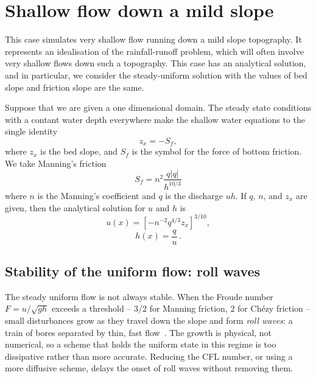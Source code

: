 

\section{Shallow flow down a mild slope}
This case simulates very shallow flow running down a mild slope topography. It represents an idealisation of the rainfall-runoff problem, which will often involve very shallow flows down such a topography. This case has an analytical solution, and in particular, we consider the steady-uniform solution with the values of bed slope and friction slope are the same.   

Suppose that we are given a one dimensional domain. The steady state conditions with a contant water depth everywhere make the shallow water equations to the single identity
\begin{equation}
z_x = - S_f, 
\end{equation}
where $z_x$ is the bed slope, and $S_f$ is the symbol for the force of bottom friction.  We take Manning's friction
\begin{equation}
S_f = n^2 \frac{q|q|}{h^{10/3}}
\end{equation}
where $n$ is the Manning's coefficient and $q$ is the discharge $uh$. 
If $q$, $n$, and $z_x$ are given, then the analytical solution for $u$ and $h$ is
\begin{equation}
u(x)= \left[- n^{-2} q^{4/3} z_x\right]^{3/10},
\end{equation}
\begin{equation}
h(x)= \frac{q}{u}\,.
\end{equation}

\subsection{Stability of the uniform flow: roll waves}
The steady uniform flow is not always stable. When the Froude number
$F = u/\sqrt{gh}$ exceeds a threshold -- $3/2$ for Manning friction, $2$ for
Ch\'ezy friction -- small disturbances grow as they travel down the slope and
form \emph{roll waves}: a train of bores separated by thin, fast
flow~\cite{Dressler1949}. The growth is physical, not numerical, so a scheme
that holds the uniform state in this regime is too dissipative rather than
more accurate. Reducing the CFL number, or using a more diffusive scheme,
delays the onset of roll waves without removing them.


